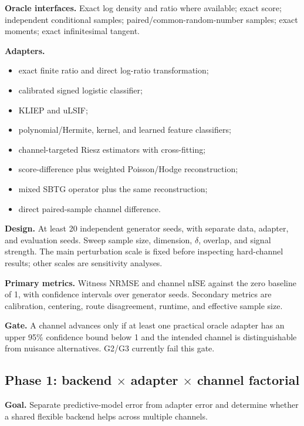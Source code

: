 \documentclass[10pt]{article}
\begin{document}
\textbf{Oracle interfaces.} Exact log density and ratio where available; exact score; independent conditional samples; paired/common-random-number samples; exact moments; exact infinitesimal tangent.

\textbf{Adapters.}

\begin{itemize}
  \item exact finite ratio and direct log-ratio transformation;
  \item calibrated signed logistic classifier;
  \item KLIEP and uLSIF;
  \item polynomial/Hermite, kernel, and learned feature classifiers;
  \item channel-targeted Riesz estimators with cross-fitting;
  \item score-difference plus weighted Poisson/Hodge reconstruction;
  \item mixed SBTG operator plus the same reconstruction;
  \item direct paired-sample channel difference.
\end{itemize}

\textbf{Design.} At least 20 independent generator seeds, with separate data, adapter, and evaluation seeds. Sweep sample size, dimension, \(\delta\), overlap, and signal strength. The main perturbation scale is fixed before inspecting hard-channel results; other scales are sensitivity analyses.

\textbf{Primary metrics.} Witness NRMSE and channel nISE against the zero baseline of 1, with confidence intervals over generator seeds. Secondary metrics are calibration, centering, route disagreement, runtime, and effective sample size.

\textbf{Gate.} A channel advances only if at least one practical oracle adapter has an upper 95\% confidence bound below 1 and the intended channel is distinguishable from nuisance alternatives. G2/G3 currently fail this gate.

\subsection{Phase 1: backend \(\times\) adapter \(\times\) channel factorial}

\textbf{Goal.} Separate predictive-model error from adapter error and determine whether a shared flexible backend helps across multiple channels.
\end{document}

